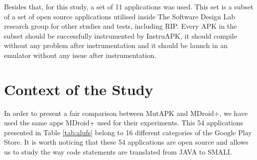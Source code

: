Besides that, for this study, a set of 11 applications was used. This set is a subset of a set of open source applications utilised inside The Software Design Lab research group for other studies and tests, including RIP. Every APK in the subset should be successfully instrumented by InstruAPK, it should compile without any problem after instrumentation and it should be launch in an emulator without any issue after instrumentation.

\section{Context of the Study}

In order to present a fair comparison between MutAPK and MDroid+, we have used the same apps MDroid+ used for their experiments. This 54 applications presented in Table \ref{tab:alufs} belong to 16 different categories of the Google Play Store. It is worth noticing that these 54 applications are open source and allows us to study the way code statements are translated from JAVA to SMALI.

